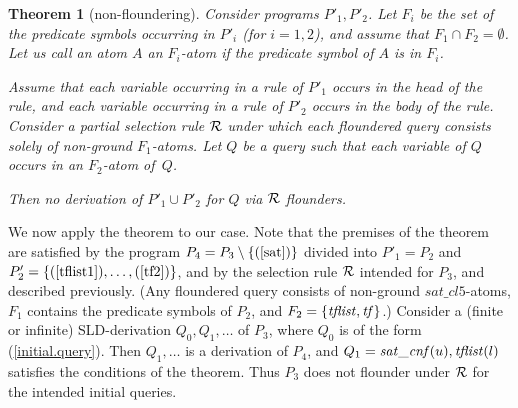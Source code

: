 \documentclass{tlp}
\newtheorem{theorem}{Theorem}
\begin{document}
\begin{theorem}[non-floundering]
\label{th:test-generate}
Consider programs $P'_1,P'_2$. 
Let $F_i$ be the set of the predicate symbols occurring in $P'_i$ (for $i=1,2$),
and assume that  $F_1\cap F_2 =\emptyset$.
Let us call an atom $A$ an $F_i$-atom if the predicate symbol of $A$ is in
$F_i$. 

Assume that
each variable occurring in a rule of $P'_1$ occurs in the head of the rule, 
and each variable occurring in a rule of $P'_2$ occurs in the body of the rule.
Consider a partial selection rule $\cal R$ under which each floundered query
consists solely of non-ground $F_1$-atoms.
Let $Q$ be a query such that each variable of $Q$ occurs in
an $F_2$-atom of~$Q$.


Then no derivation of $P'_1\cup P'_2$ for $Q$ via $\cal R$ flounders.
\end{theorem}



We now apply the theorem to our case.
Note that the premises of the theorem are satisfied by the
program $P_4= P_3\setminus \{(\ref{sat})\}$ divided into
$P'_{1}=P_2$ and $P'_{2}=\{(\ref{tflist1}),\ldots,(\ref{tf2})\}$,
and by the selection rule $\cal R$ intended for $P_3$, and described previously.
(Any floundered query consists of non-ground $sat\_cl5$-atoms,
$F_1$ contains the predicate symbols of $P_2$, and
 $F_2 = \{ {\it t f list}, {\it t f} \}$.)
Consider a (finite or infinite)
 SLD-derivation $Q_0, Q_1,\ldots$ of $P_3$, where $Q_0$ is of the
form (\ref{initial.query}).  Then $Q_1,\ldots$ is a derivation of $P_4$, and
$Q_1={\it sat\_c n f}({u}),{\it t f list}(l)$ satisfies the conditions of the
theorem.
Thus $P_3$ does not flounder under $\cal R$ for the intended initial queries.
\end{document}
